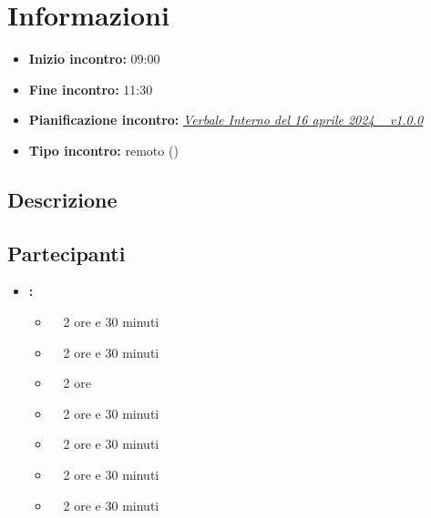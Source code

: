 \section{Informazioni}
\begin{itemize}
	\item \textbf{Inizio incontro:} 09:00
	\item \textbf{Fine incontro:} 11:30
	\item \textbf{Pianificazione incontro:} \href{https://argo-swe.github.io/2 - RTB/Verbali/Interni/VerbaleInterno_2024-04-16.pdf}{\emph{Verbale Interno del 16 aprile 2024 \  v1.0.0}}
	\item \textbf{Tipo incontro:} remoto ()
\end{itemize}

\subsection{Descrizione}
\DocDescription

\subsection{Partecipanti}

\begin{itemize}
	\item \textbf{\GroupName:}
	\begin{itemize}
		\item \tommaso \ \rightarrow\ 2 ore e 30 minuti
		\item \marco \ \rightarrow\ 2 ore e 30 minuti
		\item \sebastiano \ \rightarrow\ 2 ore
		\item \martina \ \rightarrow\ 2 ore e 30 minuti
		\item \riccardo \ \rightarrow\ 2 ore e 30 minuti
		\item \mattia \ \rightarrow\ 2 ore e 30 minuti
    \item \raul \ \rightarrow\ 2 ore e 30 minuti
	\end{itemize}
\end{itemize}

\clearpage